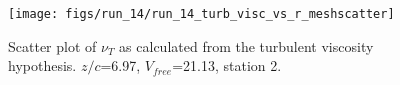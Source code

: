 \begin{figure}[H]
\centering
\texttt{[image: figs/run\_14/run\_14\_turb\_visc\_vs\_r\_meshscatter]}
\caption{Scatter plot of $\nu_T$ as calculated from the turbulent viscosity hypothesis. $z/c$=6.97, $V_{free}$=21.13, station 2.}
\label{fig:run_14_turb_visc_vs_r_meshscatter}
\end{figure}


